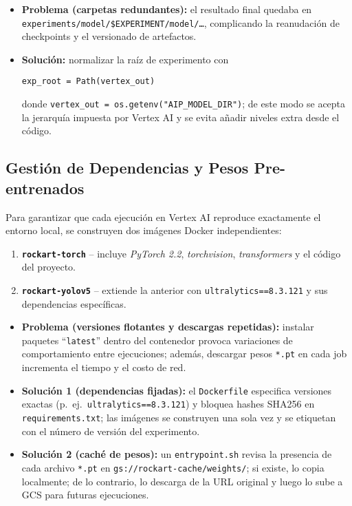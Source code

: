 \begin{itemize}
   \item \textbf{Problema (carpetas redundantes):} el resultado final quedaba en \texttt{experiments/model/\$EXPERIMENT/model/…}, complicando la reanudación de checkpoints y el versionado de artefactos.
   \item \textbf{Solución:} normalizar la raíz de experimento con\par
         \verb|exp_root = Path(vertex_out)|\par
         donde \verb|vertex_out = os.getenv("AIP_MODEL_DIR")|;
         de este modo se acepta la jerarquía impuesta por Vertex AI y se evita añadir niveles extra desde el código.
\end{itemize}

\subsection{Gestión de Dependencias y Pesos Pre-entrenados}\label{ssec:deps}

Para garantizar que cada ejecución en Vertex AI reproduce exactamente el entorno local, se construyen dos imágenes Docker independientes:

\begin{enumerate}
   \item \textbf{\texttt{rockart-torch}} – incluye \textit{PyTorch 2.2}, \textit{torchvision}, \textit{transformers} y el código del proyecto.
   \item \textbf{\texttt{rockart-yolov5}} – extiende la anterior con \texttt{ultralytics==8.3.121} y sus dependencias específicas.
\end{enumerate}

\begin{itemize}
   \item \textbf{Problema (versiones flotantes y descargas repetidas):} instalar paquetes “\texttt{latest}” dentro del contenedor provoca variaciones de comportamiento entre ejecuciones; además, descargar pesos \texttt{*.pt} en cada job incrementa el tiempo y el costo de red.
   \item \textbf{Solución 1 (dependencias fijadas):} el \texttt{Dockerfile} especifica versiones exactas (p.\ ej.\ \texttt{ultralytics==8.3.121}) y bloquea hashes SHA256 en \texttt{requirements.txt}; las imágenes se construyen una sola vez y se etiquetan con el número de versión del experimento.
   \item \textbf{Solución 2 (caché de pesos):} un \texttt{entrypoint.sh} revisa la presencia de cada archivo \texttt{*.pt} en \texttt{gs://rockart-cache/weights/}; si existe, lo copia localmente; de lo contrario, lo descarga de la URL original y luego lo sube a GCS para futuras ejecuciones.
\end{itemize}

